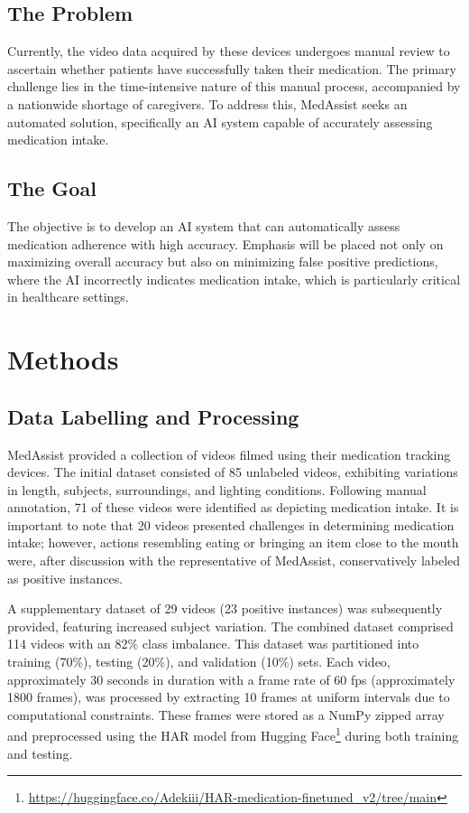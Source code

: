 \documentclass[a4paper,12pt]{article}
\begin{document}
\subsection{The Problem}
Currently, the video data acquired by these devices undergoes manual review to ascertain whether patients have successfully
 taken their medication. The primary challenge lies in the time-intensive nature of this manual process, accompanied by a 
 nationwide shortage of caregivers. To address this, MedAssist seeks an automated solution, specifically an AI system 
 capable of accurately assessing medication intake.

\subsection{The Goal}
The objective is to develop an AI system that can automatically assess medication adherence with high accuracy. Emphasis 
will be placed not only on maximizing overall accuracy but also on minimizing false positive predictions, where the AI
incorrectly indicates medication intake, which is particularly critical in healthcare settings.

\section{Methods}
\subsection{Data Labelling and Processing}

MedAssist provided a collection of videos filmed using their medication tracking devices. The initial dataset consisted 
of 85 unlabeled videos, exhibiting variations in length, subjects, surroundings, and lighting conditions. Following 
manual annotation, 71 of these videos were identified as depicting medication intake. It is important to note that 20 videos 
presented challenges in determining medication intake; however, actions resembling eating or bringing an item close to 
the mouth were, after discussion with the representative of MedAssist, conservatively labeled as positive instances.

A supplementary dataset of 29 videos (23 positive instances) was subsequently provided, featuring increased subject variation. 
The combined dataset comprised 114 videos with an 82\% class imbalance. This dataset was partitioned into training (70\%), 
testing (20\%), and validation (10\%) sets. Each video, approximately 30 seconds in duration with a frame rate of 60 fps 
(approximately 1800 frames), was processed by extracting 10 frames at uniform intervals due to computational constraints. 
These frames were stored as a NumPy zipped array and preprocessed using the HAR model from Hugging Face\footnote{\url{https://huggingface.co/Adekiii/HAR-medication-finetuned_v2/tree/main}} during both training and testing.
\end{document}
